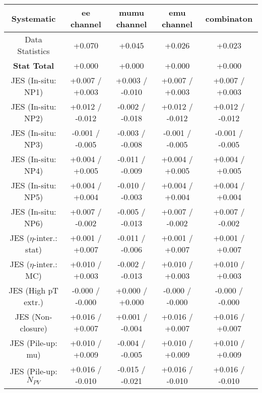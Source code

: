 \begin{table}[htbp]
\scriptsize
  \begin{center} 
  \begin{tabular}{|c|c|c|c|c|}
  \hline
Systematic                            &  ee channel&  mumu channel&  emu channel&  combinaton\\
  \hline
Data Statistics                       &+0.070              & +0.045              & +0.026              & +0.023             \\
\hline
\textbf{Stat Total}                   &+0.000              & +0.000              & +0.000              & +0.000             \\
\hline
JES (In-situ: NP1)                    &+0.007   / +0.003   & +0.003   / -0.010   & +0.007   / +0.003   & +0.007   / +0.003  \\
JES (In-situ: NP2)                    &+0.012   / -0.012   & -0.002   / -0.018   & +0.012   / -0.012   & +0.012   / -0.012  \\
JES (In-situ: NP3)                    &-0.001   / -0.005   & -0.003   / -0.008   & -0.001   / -0.005   & -0.001   / -0.005  \\
JES (In-situ: NP4)                    &+0.004   / +0.005   & -0.011   / -0.009   & +0.004   / +0.005   & +0.004   / +0.005  \\
JES (In-situ: NP5)                    &+0.004   / +0.004   & -0.010   / -0.003   & +0.004   / +0.004   & +0.004   / +0.004  \\
JES (In-situ: NP6)                    &+0.007   / -0.002   & -0.005   / -0.013   & +0.007   / -0.002   & +0.007   / -0.002  \\
JES ($\eta$-inter.: stat)               &+0.001   / +0.007   & -0.011   / -0.006   & +0.001   / +0.007   & +0.001   / +0.007  \\
JES ($\eta$-inter.: MC)                 &+0.010   / +0.003   & -0.002   / -0.013   & +0.010   / +0.003   & +0.010   / +0.003  \\
JES (High pT extr.)                  &-0.000   / -0.000   & +0.000   / +0.000   & -0.000   / -0.000   & -0.000   / -0.000  \\
JES (Non-closure)                     &+0.016   / +0.007   & +0.001   / -0.004   & +0.016   / +0.007   & +0.016   / +0.007  \\
JES (Pile-up: mu)                     &+0.010   / +0.009   & -0.004   / -0.005   & +0.010   / +0.009   & +0.010   / +0.009  \\
JES (Pile-up: $N_{PV}$                  &+0.016   / -0.010   & -0.015   / -0.021   & +0.016   / -0.010   & +0.016   / -0.010  \\

\end{tabular}
\end{center}
\end{table}
